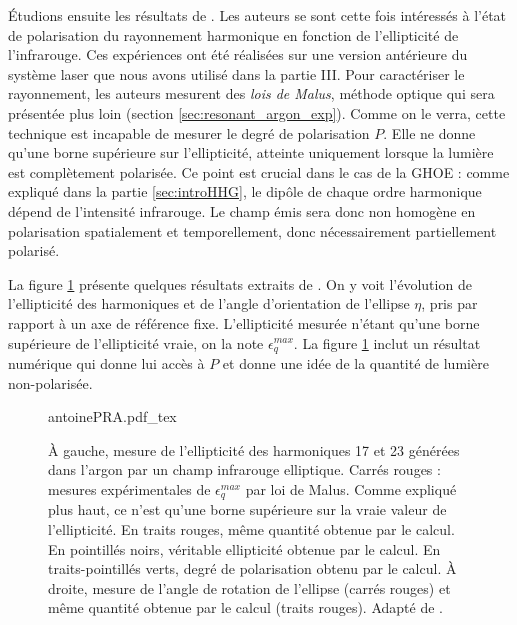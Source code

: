 \'{E}tudions ensuite les résultats de . Les auteurs se sont cette fois intéressés à l'état de polarisation du rayonnement harmonique en fonction de l'ellipticité de l'infrarouge. Ces expériences ont été réalisées sur une version antérieure du système laser que nous avons utilisé dans la partie III. Pour caractériser le rayonnement, les auteurs mesurent des \textit{lois de Malus}, méthode optique qui sera présentée plus loin (section \ref{sec:resonant_argon_exp}). Comme on le verra, cette technique est incapable de mesurer le degré de polarisation $P$. Elle ne donne qu'une borne supérieure sur l'ellipticité, atteinte uniquement lorsque la lumière est complètement polarisée. Ce point est crucial dans le cas de la GHOE : comme expliqué dans la partie \ref{sec:introHHG}, le dipôle de chaque ordre harmonique dépend de l'intensité infrarouge. Le champ émis sera donc non homogène en polarisation spatialement et temporellement, donc nécessairement partiellement polarisé.

La figure \ref{fig:antoinepra} présente quelques résultats extraits de . On y voit l'évolution de l'ellipticité des harmoniques et de l'angle d'orientation de l'ellipse $\eta$, pris par rapport à un axe de référence fixe. L'ellipticité mesurée n'étant qu'une borne supérieure de l'ellipticité vraie, on la note $\epsilon^{max}_q$. La figure \ref{fig:antoinepra} inclut un résultat numérique qui donne lui accès à $P$ et donne une idée de la quantité de lumière non-polarisée.

\begin{figure}[!ht]
\centering
\def\svgwidth{\columnwidth}
{antoinePRA.pdf_tex}
\caption{\`{A} gauche, mesure de l'ellipticité des harmoniques 17 et 23 générées dans l'argon par un champ infrarouge elliptique. Carrés rouges : mesures expérimentales de $\epsilon^{max}_q$ par loi de Malus. Comme expliqué plus haut, ce n'est qu'une borne supérieure sur la vraie valeur de l'ellipticité. En traits rouges, même quantité obtenue par le calcul. En pointillés noirs, véritable ellipticité obtenue par le calcul. En traits-pointillés verts, degré de polarisation obtenu par le calcul. \`{A} droite, mesure de l'angle de rotation de l'ellipse (carrés rouges) et même quantité obtenue par le calcul (traits rouges). Adapté de .}
\label{fig:antoinepra}
\end{figure}

